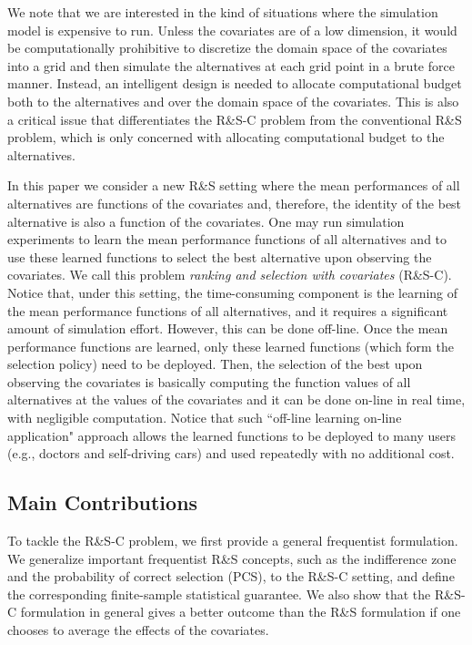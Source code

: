 \documentclass[ijoc,nonblindrev]{informs3}
\begin{document}
We note that we are interested in the kind of situations where the simulation model is expensive to run.
Unless the covariates are of a low dimension, it would be computationally prohibitive to discretize the domain space of the covariates into a grid and then simulate the alternatives at each grid point in a brute force manner.
Instead, an intelligent design is needed to allocate computational budget both to the alternatives and over the domain space of the covariates.
This is also a critical issue that differentiates the R\&S-C problem from the conventional R\&S problem,
which is only concerned with allocating computational budget to the alternatives.



In this paper we consider a new R\&S setting where the mean performances of all alternatives are functions of the covariates and, therefore, the identity of the best alternative is also a function of the covariates.
One may run simulation experiments to learn the mean performance functions of all alternatives and to use these learned functions to select the best alternative upon observing the covariates.
We call this problem \textit{ranking and selection with covariates} (R\&S-C).
Notice that, under this setting, the time-consuming component is the learning of the mean performance functions of all alternatives, and it requires a significant amount of simulation effort.
However, this can be done off-line.
Once the mean performance functions are learned, only these learned functions (which form the selection policy) need to be deployed.
Then, the selection of the best upon observing the covariates is basically computing the function values of all alternatives at the values of the covariates and it can be done on-line in real time, with negligible computation.
Notice that such ``off-line learning on-line application" approach allows the learned functions to be deployed to many users (e.g., doctors and self-driving cars) and used repeatedly with no additional cost.




\subsection{Main Contributions}

To tackle the R\&S-C problem, we first provide a general frequentist formulation.
We generalize important frequentist R\&S concepts, such as the indifference zone and the probability of correct selection (PCS), to the R\&S-C setting, and define the corresponding finite-sample statistical guarantee.
We also show that the R\&S-C formulation in general gives a better outcome than the R\&S formulation if one chooses to average the effects of the covariates.
\end{document}
